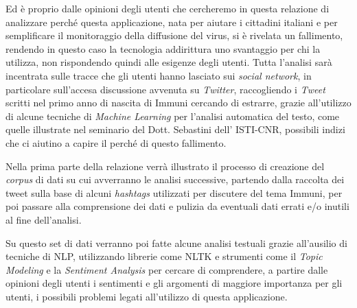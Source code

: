 Ed è proprio dalle opinioni degli utenti che cercheremo in questa relazione di analizzare perché questa applicazione, nata per aiutare i cittadini italiani e per semplificare il monitoraggio della diffusione del virus, si è rivelata un fallimento, rendendo in questo caso la tecnologia addirittura uno svantaggio per chi la utilizza, non rispondendo quindi alle esigenze degli utenti. Tutta l'analisi sarà incentrata sulle tracce che gli utenti hanno lasciato sui \textit{social network}, in particolare sull'accesa discussione avvenuta su \textit{Twitter}, raccogliendo i \textit{Tweet} scritti nel primo anno di nascita di Immuni cercando di estrarre, grazie all'utilizzo di alcune tecniche di \textit{Machine Learning} per l'analisi automatica del testo, come quelle illustrate nel seminario del Dott. Sebastini dell' ISTI-CNR, possibili indizi che ci aiutino a capire il perché di questo fallimento.

Nella prima parte della relazione verrà illustrato il processo di creazione del \textit{corpus} di dati su cui avverranno le analisi successive, partendo dalla raccolta dei tweet sulla base di alcuni \textit{hashtags} utilizzati per discutere del tema Immuni, per poi passare alla comprensione dei dati e pulizia da eventuali dati errati e/o inutili al fine dell'analisi.

Su questo set di dati verranno poi fatte alcune analisi testuali grazie all'ausilio di tecniche di NLP, utilizzando librerie come NLTK e strumenti come il \textit{Topic Modeling} e la \textit{Sentiment Analysis} per cercare di comprendere, a partire dalle opinioni degli utenti i sentimenti e gli argomenti di maggiore importanza per gli utenti, i possibili problemi legati all'utilizzo di questa applicazione.






